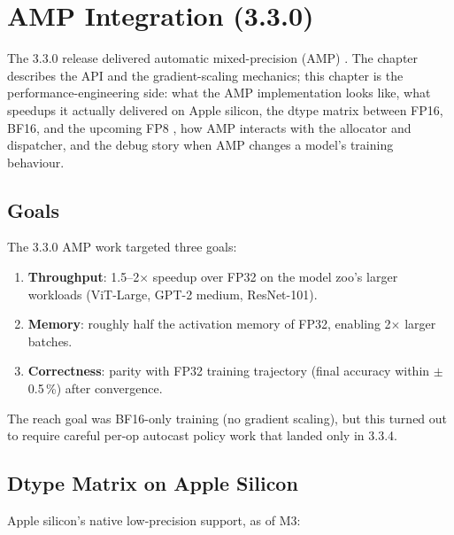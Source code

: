 \chapter{AMP Integration (3.3.0)}
\label{ch:amp_integration}

The 3.3.0 release delivered automatic mixed-precision (AMP)
\cite{micikevicius_mixed_2018}. The chapter
 describes the API and the gradient-scaling
mechanics; this chapter is the performance-engineering side:
what the AMP implementation looks like, what speedups it
actually delivered on Apple silicon, the dtype matrix
between FP16, BF16, and the upcoming FP8 \cite{micikevicius_fp8_2022},
how AMP interacts with the allocator and dispatcher, and the
debug story when AMP changes a model's training behaviour.

\section{Goals}
\label{sec:amp_integration:goals}

The 3.3.0 AMP work targeted three goals:

\begin{enumerate}
  \item \textbf{Throughput}: 1.5--2$\times$ speedup over FP32
    on the model zoo's larger workloads (ViT-Large, GPT-2
    medium, ResNet-101).
  \item \textbf{Memory}: roughly half the activation memory
    of FP32, enabling 2$\times$ larger batches.
  \item \textbf{Correctness}: parity with FP32 training
    trajectory (final accuracy within $\pm$\,0.5\,\%) after
    convergence.
\end{enumerate}

The reach goal was BF16-only training (no gradient scaling), but
this turned out to require careful per-op autocast policy
work that landed only in 3.3.4.

\section{Dtype Matrix on Apple Silicon}
\label{sec:amp_integration:dtype_matrix}

Apple silicon's native low-precision support, as of M3:

